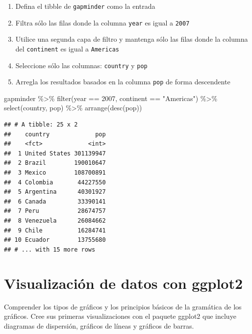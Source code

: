 \documentclass[
]{book}
\newenvironment{Shaded}{\begin{snugshade}}{\end{snugshade}}
\newcommand{\DecValTok}[1]{\textcolor[rgb]{0.00,0.00,0.81}{#1}}
\newcommand{\FunctionTok}[1]{\textcolor[rgb]{0.00,0.00,0.00}{#1}}
\newcommand{\NormalTok}[1]{#1}
\newcommand{\SpecialCharTok}[1]{\textcolor[rgb]{0.00,0.00,0.00}{#1}}
\newcommand{\StringTok}[1]{\textcolor[rgb]{0.31,0.60,0.02}{#1}}
\providecommand{\tightlist}{%
  \setlength{\itemsep}{0pt}\setlength{\parskip}{0pt}}
\begin{document}
\begin{enumerate}
\def\labelenumi{\arabic{enumi}.}
\tightlist
\item
  Defina el tibble de \texttt{gapminder} como la entrada
\item
  Filtra sólo las filas donde la columna \texttt{year} es igual a \texttt{2007}
\item
  Utilice una segunda capa de filtro y mantenga sólo las filas donde la columna del \texttt{continent} es igual a \texttt{Americas}
\item
  Seleccione sólo las columnas: \texttt{country} y \texttt{pop}
\item
  Arregla los resultados basados en la columna \texttt{pop} de forma descendente
\end{enumerate}

\begin{Shaded}
\begin{Highlighting}[]
\NormalTok{gapminder }\SpecialCharTok{\%\textgreater{}\%}
  \FunctionTok{filter}\NormalTok{(year }\SpecialCharTok{==} \DecValTok{2007}\NormalTok{, continent }\SpecialCharTok{==} \StringTok{"Americas"}\NormalTok{) }\SpecialCharTok{\%\textgreater{}\%}
  \FunctionTok{select}\NormalTok{(country, pop) }\SpecialCharTok{\%\textgreater{}\%}
  \FunctionTok{arrange}\NormalTok{(}\FunctionTok{desc}\NormalTok{(pop))}
\end{Highlighting}
\end{Shaded}

\begin{verbatim}
## # A tibble: 25 x 2
##    country             pop
##    <fct>             <int>
##  1 United States 301139947
##  2 Brazil        190010647
##  3 Mexico        108700891
##  4 Colombia       44227550
##  5 Argentina      40301927
##  6 Canada         33390141
##  7 Peru           28674757
##  8 Venezuela      26084662
##  9 Chile          16284741
## 10 Ecuador        13755680
## # ... with 15 more rows
\end{verbatim}

\hypertarget{visualizaciuxf3n-de-datos-con-ggplot2}{%
\chapter{Visualización de datos con ggplot2}\label{visualizaciuxf3n-de-datos-con-ggplot2}}

Comprender los tipos de gráficos y los principios básicos de la gramática de los gráficos. Cree sus primeras visualizaciones con el paquete ggplot2 que incluye diagramas de dispersión, gráficos de líneas y gráficos de barras.
\end{document}
